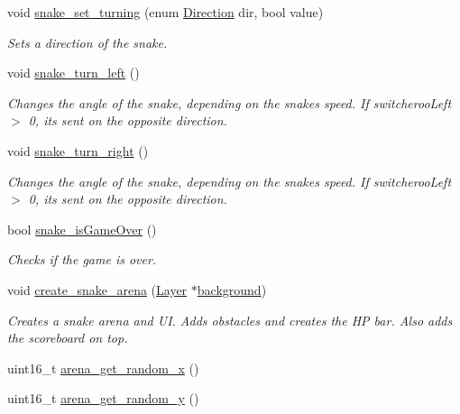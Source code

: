 \begin{DoxyCompactItemize}
void \mbox{\hyperlink{group__snake_ga0b5ae42db7d2fc61358217de9c031c5a}{snake\+\_\+set\+\_\+turning}} (enum \mbox{\hyperlink{group__snake_ga224b9163917ac32fc95a60d8c1eec3aa}{Direction}} dir, bool value)
\begin{DoxyCompactList}\small\item\em Sets a direction of the snake. \end{DoxyCompactList}\item 
void \mbox{\hyperlink{group__snake_ga170531808ef1c4ac7d2481cd4278da99}{snake\+\_\+turn\+\_\+left}} ()
\begin{DoxyCompactList}\small\item\em Changes the angle of the snake, depending on the snake\textquotesingle{}s speed. If switcheroo\+Left $>$ 0, it\textquotesingle{}s sent on the opposite direction. \end{DoxyCompactList}\item 
void \mbox{\hyperlink{group__snake_ga9e40ed1a994c3ddde19f5e841d811116}{snake\+\_\+turn\+\_\+right}} ()
\begin{DoxyCompactList}\small\item\em Changes the angle of the snake, depending on the snake\textquotesingle{}s speed. If switcheroo\+Left $>$ 0, it\textquotesingle{}s sent on the opposite direction. \end{DoxyCompactList}\item 
bool \mbox{\hyperlink{group__snake_gad811f495494285ab98c9b22080829668}{snake\+\_\+is\+Game\+Over}} ()
\begin{DoxyCompactList}\small\item\em Checks if the game is over. \end{DoxyCompactList}\item 
void \mbox{\hyperlink{group__snake_gae7016570a88c488abe2dabb31467daf8}{create\+\_\+snake\+\_\+arena}} (\mbox{\hyperlink{struct_layer}{Layer}} $\ast$\mbox{\hyperlink{wordpicker_8c_a202b703352248e94db55f961e7938e08}{background}})
\begin{DoxyCompactList}\small\item\em Creates a snake arena and UI. Adds obstacles and creates the HP bar. Also adds the scoreboard on top. \end{DoxyCompactList}\item 
uint16\+\_\+t \mbox{\hyperlink{group__snake_gaf1c909afe83fd09c4650ea8a0413fbf2}{arena\+\_\+get\+\_\+random\+\_\+x}} ()
\item 
uint16\+\_\+t \mbox{\hyperlink{group__snake_ga7de9235e557e3ecd489919b5907e53ff}{arena\+\_\+get\+\_\+random\+\_\+y}} ()

\end{DoxyCompactItemize}
